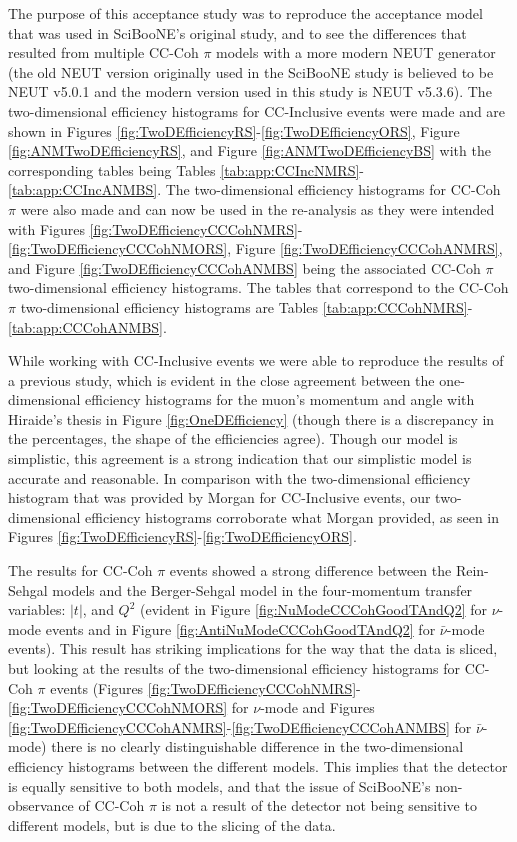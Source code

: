 \documentclass[11pt]{article}
\begin{document}
The purpose of this acceptance study was to reproduce the acceptance model that was used in SciBooNE's original study, and to see the differences that resulted from multiple CC-Coh $\pi$ models with a more modern NEUT generator (the old NEUT version originally used in the SciBooNE study is believed to be NEUT v5.0.1 and the modern version used in this study is NEUT v5.3.6). The two-dimensional efficiency histograms for CC-Inclusive events were made and are shown in Figures \ref*{fig:TwoDEfficiencyRS}-\ref*{fig:TwoDEfficiencyORS}, Figure \ref*{fig:ANMTwoDEfficiencyRS}, and Figure \ref*{fig:ANMTwoDEfficiencyBS} with the corresponding tables being Tables \ref*{tab:app:CCIncNMRS}-\ref*{tab:app:CCIncANMBS}. The two-dimensional efficiency histograms for CC-Coh $\pi$ were also made and can now be used in the re-analysis as they were intended with Figures \ref*{fig:TwoDEfficiencyCCCohNMRS}-\ref*{fig:TwoDEfficiencyCCCohNMORS}, Figure \ref*{fig:TwoDEfficiencyCCCohANMRS}, and Figure \ref*{fig:TwoDEfficiencyCCCohANMBS} being the associated CC-Coh $\pi$ two-dimensional efficiency histograms. The tables that correspond to the CC-Coh $\pi$ two-dimensional efficiency histograms are Tables \ref*{tab:app:CCCohNMRS}-\ref*{tab:app:CCCohANMBS}.

While working with CC-Inclusive events we were able to reproduce the results of a previous study, which is evident in the close agreement between the one-dimensional efficiency histograms for the muon's momentum and angle with Hiraide's thesis in Figure \ref*{fig:OneDEfficiency} (though there is a discrepancy in the percentages, the shape of the efficiencies agree). Though our model is simplistic, this agreement is a strong indication that our simplistic model is accurate and reasonable. In comparison with the two-dimensional efficiency histogram that was provided by Morgan for CC-Inclusive events, our two-dimensional efficiency histograms corroborate what Morgan provided, as seen in Figures \ref*{fig:TwoDEfficiencyRS}-\ref*{fig:TwoDEfficiencyORS}.

The results for CC-Coh $\pi$ events showed a strong difference between the Rein-Sehgal models and the Berger-Sehgal model in the four-momentum transfer variables: $|t|$, and $Q^2$ (evident in Figure \ref*{fig:NuModeCCCohGoodTAndQ2} for $\nu$-mode events and in Figure \ref*{fig:AntiNuModeCCCohGoodTAndQ2} for $\bar{\nu}$-mode events). This result has striking implications for the way that the data is sliced, but looking at the results of the two-dimensional efficiency histograms for CC-Coh $\pi$ events (Figures \ref*{fig:TwoDEfficiencyCCCohNMRS}-\ref*{fig:TwoDEfficiencyCCCohNMORS} for $\nu$-mode and Figures \ref*{fig:TwoDEfficiencyCCCohANMRS}-\ref*{fig:TwoDEfficiencyCCCohANMBS} for $\bar{\nu}$-mode) there is no clearly distinguishable difference in the two-dimensional efficiency histograms between the different models. This implies that the detector is equally sensitive to both models, and that the issue of SciBooNE's non-observance of CC-Coh $\pi$ is not a result of the detector not being sensitive to different models, but is due to the slicing of the data.
\end{document}
